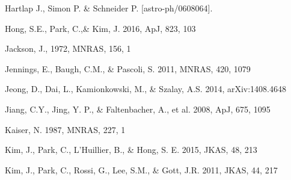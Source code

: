 \documentclass[iop]{emulateapj}
\begin{document}
\begin{thebibliography}{}








Hartlap J., Simon P. \& Schneider P. [astro-ph/0608064].


Hong, S.E., Park, C.,\&  Kim, J. 2016, ApJ, 823, 103

Jackson, J., 1972, MNRAS, 156, 1

Jennings, E., Baugh, C.M., \& Pascoli, S. 2011, MNRAS, 420, 1079  

Jeong, D., Dai, L., Kamionkowski, M., \& Szalay, A.S. 2014, arXiv:1408.4648

Jiang, C.Y., Jing, Y. P., \& Faltenbacher, A., et al. 2008, ApJ, 675, 1095

Kaiser, N. 1987, MNRAS, 227, 1




Kim, J., Park, C., L'Huillier, B., \& Hong, S. E. 2015, JKAS, 48, 213

Kim, J., Park, C., Rossi, G., Lee, S.M., \& Gott, J.R. 2011, JKAS, 44, 217  



\end{thebibliography}
\end{document}
